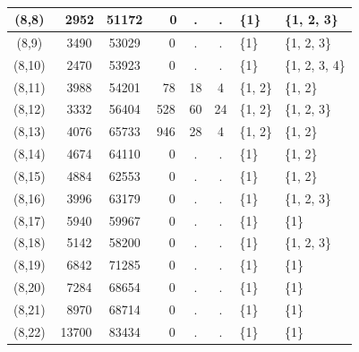 \begin{table}[!ht]
\begin{center}
\begin{tabular}{|c|c|c|c|c|c|l|l|}
    (8,8) & \ 2952 & 51172 & \ \ 0 & . & . &\{1\} & \{1, 2, 3\} \\
    \hline
    (8,9) & \ 3490 & 53029 & \ \ 0 & . & . &\{1\} & \{1, 2, 3\} \\
    \hline
    (8,10) & \ 2470 & 53923 & \ \ 0 & . & . &\{1\} & \{1, 2, 3, 4\} \\
    \hline
    (8,11) & \ 3988 & 54201 & \ 78 & 18 & 4 & \{1, 2\} & \{1, 2\} \\
    \hline
    (8,12) & \ 3332 & 56404 & 528 & 60 & 24 & \{1, 2\} & \{1, 2, 3\} \\
    \hline
    (8,13) & \ 4076 & 65733 & 946 & 28 & 4 & \{1, 2\} & \{1, 2\} \\
    \hline
    (8,14) & \ 4674 & 64110 & \ \ 0 & . & . &\{1\} & \{1, 2\} \\
    \hline
    (8,15) & \ 4884 & 62553 & \ \ 0 & . & . &\{1\} & \{1, 2\} \\
    \hline
    (8,16) & \ 3996 & 63179 & \ \ 0 & . & . &\{1\} & \{1, 2, 3\} \\
    \hline
    (8,17) & \ 5940 & 59967 & \ \ 0 & . & . &\{1\} & \{1\} \\
    \hline
    (8,18) & \ 5142 & 58200 & \ \ 0 & . & . &\{1\} & \{1, 2, 3\} \\
    \hline
    (8,19) & \ 6842 & 71285 & \ \ 0 & . & . &\{1\} & \{1\} \\
    \hline
    (8,20) & \ 7284 & 68654 & \ \ 0 & . & . &\{1\} & \{1\} \\
    \hline
    (8,21) & \ 8970 & 68714 & \ \ 0 & . & . &\{1\} & \{1\} \\
    \hline
    (8,22) & 13700 & 83434 & \ \ 0 & . & . &\{1\} & \{1\} \\
    \hline
    \end{tabular}
    \end{center}
    \caption{
    \footnotesize{}}
    \label{table_trees_summary_analysis_vertices_etc_FULL}
\end{table}


